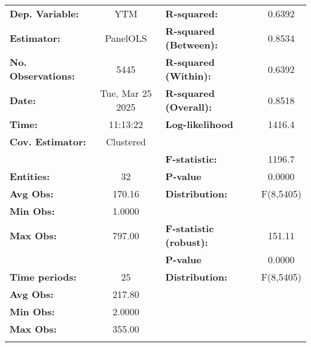 \begin{center}
\begin{tabular}{lclc}
\toprule
\textbf{Dep. Variable:}         &        YTM         & \textbf{  R-squared:         }   &      0.6392      \\
\textbf{Estimator:}             &      PanelOLS      & \textbf{  R-squared (Between):}  &      0.8534      \\
\textbf{No. Observations:}      &        5445        & \textbf{  R-squared (Within):}   &      0.6392      \\
\textbf{Date:}                  &  Tue, Mar 25 2025  & \textbf{  R-squared (Overall):}  &      0.8518      \\
\textbf{Time:}                  &      11:13:22      & \textbf{  Log-likelihood     }   &      1416.4      \\
\textbf{Cov. Estimator:}        &     Clustered      & \textbf{                     }   &                  \\
\textbf{}                       &                    & \textbf{  F-statistic:       }   &      1196.7      \\
\textbf{Entities:}              &         32         & \textbf{  P-value            }   &      0.0000      \\
\textbf{Avg Obs:}               &       170.16       & \textbf{  Distribution:      }   &    F(8,5405)     \\
\textbf{Min Obs:}               &       1.0000       & \textbf{                     }   &                  \\
\textbf{Max Obs:}               &       797.00       & \textbf{  F-statistic (robust):} &      151.11      \\
\textbf{}                       &                    & \textbf{  P-value            }   &      0.0000      \\
\textbf{Time periods:}          &         25         & \textbf{  Distribution:      }   &    F(8,5405)     \\
\textbf{Avg Obs:}               &       217.80       & \textbf{                     }   &                  \\
\textbf{Min Obs:}               &       2.0000       & \textbf{                     }   &                  \\
\textbf{Max Obs:}               &       355.00       & \textbf{                     }   &                  \\
\textbf{}                       &                    & \textbf{                     }   &                  \\

\end{tabular}
\end{center}
